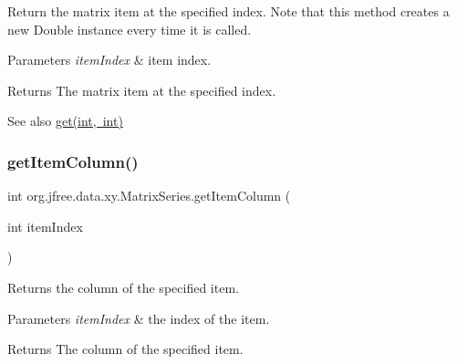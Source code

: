 Return the matrix item at the specified index. Note that this method creates a new {\ttfamily Double} instance every time it is called.


\begin{DoxyParams}{Parameters}
{\em item\+Index} & item index.\\
\hline
\end{DoxyParams}
\begin{DoxyReturn}{Returns}
The matrix item at the specified index.
\end{DoxyReturn}
\begin{DoxySeeAlso}{See also}
\mbox{\hyperlink{classorg_1_1jfree_1_1data_1_1xy_1_1_matrix_series_a673ce1dc727458893120d67ed4e7a35c}{get(int, int)}} 
\end{DoxySeeAlso}
\mbox{\label{classorg_1_1jfree_1_1data_1_1xy_1_1_matrix_series_a3ed5405c62c33e1a4956902d2d9d7cd1}} 
\subsubsection{\texorpdfstring{get\+Item\+Column()}{getItemColumn()}}
{\footnotesize\ttfamily int org.\+jfree.\+data.\+xy.\+Matrix\+Series.\+get\+Item\+Column (\begin{DoxyParamCaption}\item[{int}]{item\+Index }\end{DoxyParamCaption})}

Returns the column of the specified item.


\begin{DoxyParams}{Parameters}
{\em item\+Index} & the index of the item.\\
\hline
\end{DoxyParams}
\begin{DoxyReturn}{Returns}
The column of the specified item. 
\end{DoxyReturn}
\mbox{\label{classorg_1_1jfree_1_1data_1_1xy_1_1_matrix_series_aeba52f89811d72702b3347b9e7e4bfb3}} 
